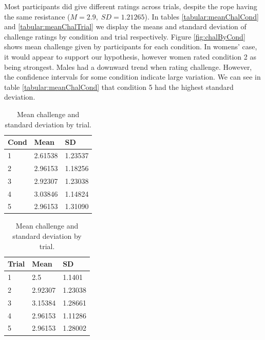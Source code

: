 Most participants did give different ratings across trials, despite the rope having the same resistance ($M=2.9,\; SD=1.21265 $). In tables \ref{tabular:meanChalCond} and \ref{tabular:meanChalTrial} we display the means and standard deviation of challenge ratings by condition and trial respectively.
Figure \ref{fig:chalByCond} shows mean challenge given by participants for each condition. In womens' case, it would appear to support our hypothesis, however women rated condition 2 as being strongest. Males had a downward trend when rating challenge. However, the confidence intervals for some condition indicate large variation. We can see in table \ref{tabular:meanChalCond} that condition 5 had the highest standard deviation.

\begin{table}[H]
 \captionsetup{justification=centering,margin=0.1cm}
 \begin{minipage}{.5\linewidth}
     \centering
\begin{tabular}{|lll|}
\hline
Cond & Mean & SD \\
\hline
1 & 2.61538 & 1.23537\\  
2 &  2.96153 & 1.18256\\ 
3 &  2.92307 & 1.23038\\ 
4 &  3.03846 & 1.14824\\  
5 & 2.96153 & 1.31090\\  
\hline
\end{tabular}
\caption{Mean challenge and standard deviation by condition.}
\label{tabular:meanChalCond}
\end{minipage}\hfill
 \begin{minipage}{.5\linewidth}
 \centering
\begin{tabular}{|lll|}
\hline
Trial & Mean & SD \\
\hline
1 & 2.5 & 1.1401\\  
2 & 2.92307 & 1.23038\\  
3 & 3.15384 &  1.28661\\  
4 & 2.96153 & 1.11286\\  
5 & 2.96153 & 1.28002\\  
\hline
\end{tabular}
\caption{Mean challenge and standard deviation by trial.}
\label{tabular:meanChalTrial}
\end{minipage}
\label{tbl:meanChalCond1}
\end{table} 


